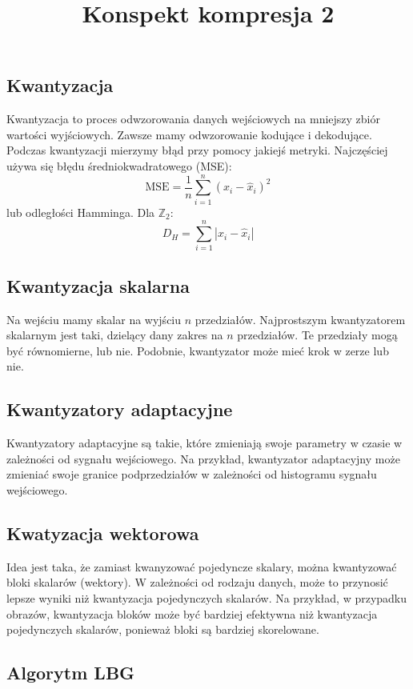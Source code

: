 \documentclass{../konspekt}
\title{Konspekt kompresja 2}
\begin{document}
\begin{multicols}{2}

  \section*{Kwantyzacja}

  Kwantyzacja to proces odwzorowania danych wejściowych na mniejszy
  zbiór wartości wyjściowych. Zawsze mamy odwzorowanie kodujące i dekodujące.
  Podczas kwantyzacji mierzymy błąd przy pomocy jakiejś metryki.
  Najczęściej używa się błędu średniokwadratowego (MSE):
  $$
  \text{MSE} = \frac{1}{n} \sum_{i=1}^{n} (x_i - \hat{x}_i)^2
  $$
  lub odległości Hamminga. Dla $\mathbb{Z}_2$:
  $$
  D_H = \sum_{i=1}^{n} |x_i - \hat{x}_i|
  $$

  \subsection*{Kwantyzacja skalarna}

  Na wejściu mamy skalar na wyjściu $n$ przedziałów. Najprostszym
  kwantyzatorem skalarnym jest
  taki, dzielący dany zakres na $n$ przedziałów. Te przedziały mogą
  być równomierne, lub nie. Podobnie, kwantyzator może mieć krok w
  zerze lub nie.

  \subsection*{Kwantyzatory adaptacyjne}

  Kwantyzatory adaptacyjne są takie, które zmieniają swoje parametry w czasie
  w zależności od sygnału wejściowego. Na przykład, kwantyzator adaptacyjny
  może zmieniać swoje granice podprzedziałów w zależności od histogramu sygnału
  wejściowego.

  \subsection*{Kwatyzacja wektorowa}

  Idea jest taka, że zamiast kwanyzować pojedyncze skalary, można kwantyzować
  bloki skalarów (wektory). W zależności od rodzaju danych, może to przynosić
  lepsze wyniki niż kwantyzacja pojedynczych skalarów. Na przykład, w przypadku
  obrazów, kwantyzacja bloków może być bardziej efektywna niż
  kwantyzacja pojedynczych
  skalarów, ponieważ bloki są bardziej skorelowane.

  \subsection*{Algorytm LBG}


\end{multicols}
\end{document}
